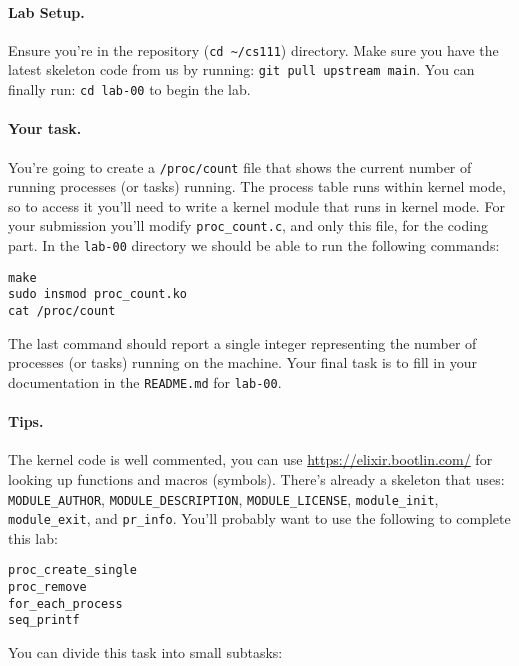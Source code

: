 \paragraph{Lab Setup.}
Ensure you're in the repository (\lstinline|cd ~/cs111|) directory.
Make sure you have the latest skeleton code from us by running:
\lstinline|git pull upstream main|.
You can finally run: \lstinline|cd lab-00| to begin the lab.

\paragraph{Your task.}

You're going to create a \lstinline|/proc/count| file that shows the current
number of running processes (or tasks) running.
The process table runs within kernel mode, so to access it you'll need to write
a kernel module that runs in kernel mode.
For your submission you'll modify \lstinline|proc_count.c|, and only this file,
for the coding part.
In the \lstinline|lab-00| directory we should be able to run the following
commands:

\begin{lstlisting}[xleftmargin=2em]
make
sudo insmod proc_count.ko
cat /proc/count 
\end{lstlisting}

\noindent
The last command should report a single integer representing the number of
processes (or tasks) running on the machine.
Your final task is to fill in your documentation in the \lstinline|README.md|
for \lstinline|lab-00|.

\paragraph{Tips.}

The kernel code is well commented, you can use \url{https://elixir.bootlin.com/}
for looking up functions and macros (symbols). There's already a skeleton that
uses: \lstinline|MODULE_AUTHOR|, \lstinline|MODULE_DESCRIPTION|,
\lstinline|MODULE_LICENSE|, \lstinline|module_init|, \lstinline|module_exit|,
and \lstinline|pr_info|.
You'll probably want to use the following to complete this lab:

\begin{lstlisting}[xleftmargin=2em]
proc_create_single
proc_remove
for_each_process
seq_printf
\end{lstlisting}

\noindent
You can divide this task into small subtasks:

